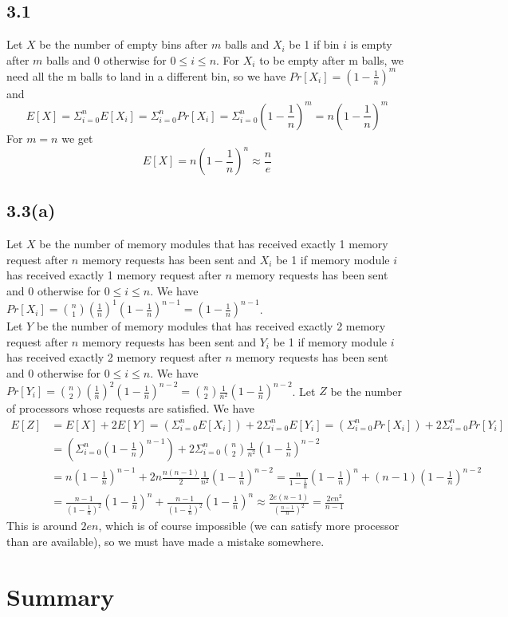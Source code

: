 \documentclass[12pt]{article}
\begin{document}
\subsection*{3.1}
Let $X$ be the number of empty bins after $m$ balls and $X_i$ be 1 if bin $i$ is empty after $m$ balls and 0 otherwise for $0\leq i\leq n$. For $X_i$ to be empty after m balls, we need all the m balls to land in a different bin, so we have $Pr[X_i]=\left(1-\frac{1}{n}\right)^m$ and $$E[X]=\Sigma_{i=0}^nE[X_i]=\Sigma_{i=0}^nPr[X_i]=\Sigma_{i=0}^n\left(1-\frac{1}{n}\right)^m=n\left(1-\frac{1}{n}\right)^m$$
For $m=n$ we get $$E[X]=n\left(1-\frac{1}{n}\right)^n\approx\frac{n}{e}$$

\subsection*{3.3(a)}
Let $X$ be the number of memory modules that has received exactly 1 memory request after $n$ memory requests has been sent and $X_i$ be 1 if memory module $i$ has received exactly 1 memory request after $n$ memory requests has been sent and 0 otherwise for $0\leq i\leq n$. We have $Pr[X_i]={n\choose 1}\left(\frac{1}{n}\right)^1\left(1-\frac{1}{n}\right)^{n-1}=\left(1-\frac{1}{n}\right)^{n-1}$.\\
Let $Y$ be the number of memory modules that has received exactly 2 memory request after $n$ memory requests has been sent and $Y_i$ be 1 if memory module $i$ has received exactly 2 memory request after $n$ memory requests has been sent and 0 otherwise for $0\leq i\leq n$. We have $Pr[Y_i]={n\choose 2}\left(\frac{1}{n}\right)^2\left(1-\frac{1}{n}\right)^{n-2}={n\choose 2}\frac{1}{n^2}\left(1-\frac{1}{n}\right)^{n-2}$.
Let $Z$ be the number of processors whose requests are satisfied. We have \begin{align*}E[Z]&=E[X]+2E[Y]=\left(\Sigma_{i=0}^nE[X_i]\right)+2\Sigma_{i=0}^nE[Y_i]=\left(\Sigma_{i=0}^nPr[X_i]\right)+2\Sigma_{i=0}^nPr[Y_i]\\&=\left(\Sigma_{i=0}^n\left(1-\frac{1}{n}\right)^{n-1}\right)+2\Sigma_{i=0}^n{n\choose 2}\frac{1}{n^2}\left(1-\frac{1}{n}\right)^{n-2}\\&=n\left(1-\frac{1}{n}\right)^{n-1}+2n\frac{n(n-1)}{2}\frac{1}{n^2}\left(1-\frac{1}{n}\right)^{n-2}=\frac{n}{1-\frac{1}{n}}\left(1-\frac{1}{n}\right)^n+(n-1)\left(1-\frac{1}{n}\right)^{n-2}\\&=\frac{n-1}{\left(1-\frac{1}{n}\right)^2}\left(1-\frac{1}{n}\right)^n+\frac{n-1}{\left(1-\frac{1}{n}\right)^2}\left(1-\frac{1}{n}\right)^n\approx\frac{2e(n-1)}{\left(\frac{n-1}{n}\right)^2}=\frac{2en^2}{n-1}\end{align*}
This is around $2en$, which is of course impossible (we can satisfy more processor than are available), so we must have made a mistake somewhere.

\pagebreak

\section*{Summary}
\end{document}
